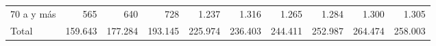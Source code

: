 \begin{tabular}{llllllllll}
\multicolumn{1}{l}{\hspace{1em}70 a y más} &
  \multicolumn{1}{|r}{565} &
  \multicolumn{1}{r}{640} &
  \multicolumn{1}{r}{728} &
  \multicolumn{1}{r}{1.237} &
  \multicolumn{1}{r}{1.316} &
  \multicolumn{1}{r}{1.265} &
  \multicolumn{1}{r}{1.284} &
  \multicolumn{1}{r}{1.300} &
  \multicolumn{1}{r}{1.305} \\
\multicolumn{1}{l}{\hspace{1em}Total} &
  \multicolumn{1}{|r}{159.643} &
  \multicolumn{1}{r}{177.284} &
  \multicolumn{1}{r}{193.145} &
  \multicolumn{1}{r}{225.974} &
  \multicolumn{1}{r}{236.403} &
  \multicolumn{1}{r}{244.411} &
  \multicolumn{1}{r}{252.987} &
  \multicolumn{1}{r}{264.474} &
  \multicolumn{1}{r}{258.003} \\
\cline{1-10}
\end{tabular}
